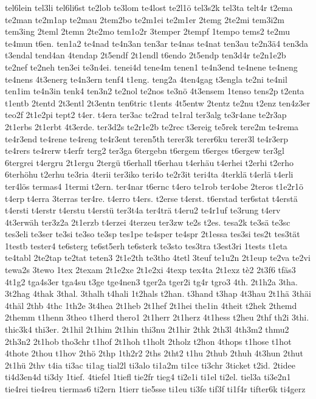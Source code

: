 {tel6lein
tel3li
tel6li6st
te2lob
te3lom
te4lost
te2l1ö
tel3s2k
tel3ta
telt4r
t2ema
te2man
te2m1ap
te2mau
2tem2bo
te2m1ei
te2m1er
2temg
2te2mi
tem3i2m
tem3ing
2teml
2temn
2te2mo
tem1o2r
3temper
2tempf
1tempo
tems2
te2mu
te4mun
t6en.
ten1a2
te4nad
te4n3an
ten3ar
te4nas
te4nat
ten3au
te2n3ä4
ten3da
t3endal
tend4an
4tendap
2t5endf
2t1endl
t6endo
2t5endp
ten3d4r
te2n1e2b
te2nef
te2neh
ten3ei
te3n4ei.
tenei4d
tene4m
tenen1
te4n3end
te4nene
te4neng
te4nens
4t3energ
te4n3ern
tenf4
t1eng.
teng2a
4ten4gag
t3engla
te2ni
te4nil
ten1im
te4n3in
tenk4
ten3n2
te2nol
te2nos
te3nö
4t3ensem
1tenso
tens2p
t2enta
t1entb
2tentd
2t3entl
2t3entn
ten6tric
t1ents
4t5entw
2tentz
te2nu
t2enz
ten4z3er
teo2f
2t1e2pi
tept2
t4er.
t4era
ter3ac
te2rad
te1ral
ter3alg
te3r4ane
te2r3ap
2t1erbs
2t1erbt
4t3erde.
ter3d2s
te2r1e2b
te2rec
t3ereig
te5rek
tere2m
te4rema
te4r3end
te4rene
te4reng
te4r3ent
teren5th
terer3k
terer6ku
terer3l
te4r3erp
te4rers
te4rerw
t4erfr
terg2
ter3ga
6tergebn
t6ergem
t6erges
t6ergew
ter3gl
6tergrei
t4ergru
2t1ergu
2tergü
t6erhall
t6erhau
t4erhäu
t4erhei
t2erhi
t2erho
6terhöhu
t2erhu
te3ria
4terii
ter3iko
teri4o
te2r3it
teri4ta
4terklä
t4erlä
t4erli
ter4lös
termas4
1termi
t2ern.
ter4nar
t6ernc
t4ero
te1rob
ter4obe
2teros
t1e2r1ö
t4erp
t4erra
3terras
ter4re.
t4erro
t4ers.
t2erse
t4erst.
t6erstad
ter6stat
t4erstä
t4ersti
t4erstr
t4erstu
t4erstü
ter3t4a
ter4trä
t4eru2
te4r1uf
te3rung
t4erv
4t3erwäh
ter3z2a
2t1erzb
t4erzei
4terzeu
ter3zw
te2s
t2es.
tesa2k
te3sä
te3sc
tes3eli
te3ser
te3si
te3so
te3sp
tes1pe
te4sper
te4spr
2t1essa
tes3si
tes2t
tes3tät
1testb
tester4
te6sterg
te6st5erh
te6sterk
te3sto
tes3tra
t3est3ri
1tests
t1eta
te4tabl
2te2tap
te2tat
teten3
2t1e2th
te3tho
4tetl
3teuf
te1u2n
2t1eup
te2va
te2vi
tewa2s
3tewo
1tex
2texam
2t1e2xe
2t1e2xi
4texp
tex4ta
2t1exz
tè2
2t3f6
tfäs3
4t1g2
tga4s3er
tga4su
t3ge
tge4nen3
tger2a
tger2i
tg4r
tgro3
4th.
2t1h2a
3tha.
3t2hag
4thak
3thal.
3thalh
t4hali
1t2hals
t2han.
t3hand
t3hap
4t3hau
2t1hä
3thäi
4thäl
2thb
4thc
1th2e
3t4hea
2t1heb
2t1hef
2t1hei
the1in
4theit
t2hek
2themd
2themm
t1henn
3theo
t1herd
thero1
2t1herr
2t1herz
4t1hess
t2heu
2thf
th2i
3thi.
thic3k4
thi3er.
2t1hil
2t1him
2t1hin
thi3nu
2t1hir
2thk
2th3l
4th3m2
thmu2
2th3n2
2t1hob
tho3chr
t1hof
2t1hoh
t1holt
2tholz
t2hon
4thops
t1hose
t1hot
4thote
2thou
t1hov
2thö
2thp
1th2r2
2ths
2tht2
t1hu
2thub
2thuh
4t3hun
2thut
2t1hü
2thv
t4ia
ti3ac
ti1ag
tial2l
ti3alo
ti1a2m
ti1ce
ti3chr
3ticket
t2id.
2tidee
ti4d3en4d
ti3dy
1tief.
4tiefel
1tiefl
tie2fr
tieg4
ti2e1i
ti1el
ti2el.
tiel3a
ti3e2n1
tie4rei
tie4reu
tiermas6
ti2ern
1tierr
tie5sse
ti1eu
ti3fe
tif3f
ti1f4r
tifter6k
ti4gerz
}
